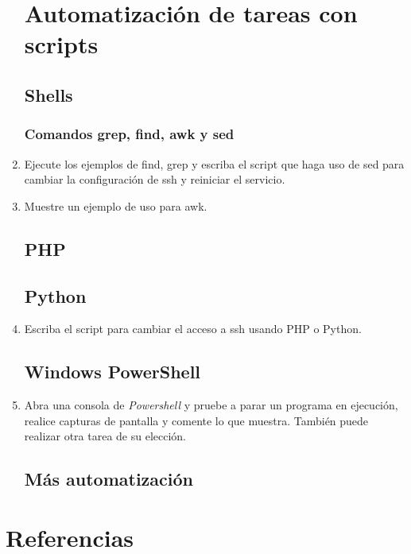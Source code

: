 \documentclass[paper=a4, fontsize=11pt]{scrartcl} %
\numberwithin{equation}{section} %
\numberwithin{figure}{section} %
\numberwithin{table}{section} %
\begin{document}
\begin{enumerate}
	\section{Automatización de tareas con scripts}
	\subsection{Shells}
	\subsubsection*{Comandos grep, find, awk y sed}
		\item Ejecute los ejemplos de find, grep y escriba el script que haga uso de sed para cambiar
		la configuración de ssh y reiniciar el servicio.
		
		
		\item Muestre un ejemplo de uso para awk.
	
	\subsection{PHP}
	\subsection{Python}
		\item Escriba el script para cambiar el acceso a ssh usando PHP o Python.
	
	\subsection{Windows PowerShell}
		\item Abra una consola de \textit{Powershell} y pruebe a parar un programa en ejecución,
		realice capturas de pantalla y comente lo que muestra. También puede realizar otra tarea de
		su elección.
	
	\subsection{Más automatización}
	
\end{enumerate}

\newpage
\section{Referencias}

\end{document}
